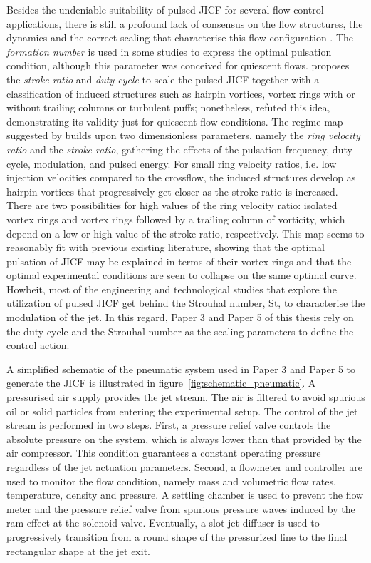 Besides the undeniable suitability of pulsed JICF for several flow control applications, there is still a profound lack of consensus on the flow structures, the dynamics and the correct scaling that characterise this flow configuration \citep{Sau2010optJICF}. The \textit{formation number} \citep{gharib1998scalingVR} is used in some studies \citep[e.g.][]{MCLOSKEY2002,shapiro2006optimization} to express the optimal pulsation condition, although this parameter was conceived for quiescent flows. \citet{Johari2006scaling} proposes the \textit{stroke ratio} and \textit{duty cycle} to scale the pulsed JICF together with a classification of induced structures such as hairpin vortices, vortex rings with or without trailing columns or turbulent puffs; nonetheless, \citet{Sau2008dynamicsVRICF} refuted this idea, demonstrating its validity just for quiescent flow conditions. The regime map suggested by \citet{Sau2010optJICF} builds upon two dimensionless parameters, namely the \textit{ring velocity ratio} and the \textit{stroke ratio}, gathering the effects of the pulsation frequency, duty cycle, modulation, and pulsed energy. For small ring velocity ratios, i.e. low injection velocities compared to the crossflow, the induced structures develop as hairpin vortices that progressively get closer as the stroke ratio is increased. There are two possibilities for high values of the ring velocity ratio: isolated vortex rings and vortex rings followed by a trailing column of vorticity, which depend on a low or high value of the stroke ratio, respectively. This map seems to reasonably fit with previous existing literature, showing that the optimal pulsation of JICF may be explained in terms of their vortex rings and that the optimal experimental conditions are seen to collapse on the same optimal curve. Howbeit, most of the engineering and technological studies that explore the utilization of pulsed JICF get behind the Strouhal number, $\mathrm{St}$, to characterise the modulation of the jet. In this regard, Paper 3 and Paper 5 of this thesis rely on the duty cycle and the Strouhal number as the scaling parameters to define the control action.

A simplified schematic of the pneumatic system used in Paper 3 and Paper 5 to generate the JICF is illustrated in figure~\ref{fig:schematic_pneumatic}. A pressurised air supply provides the jet stream. The air is filtered to avoid spurious oil or solid particles from entering the experimental setup. The control of the jet stream is performed in two steps. First, a pressure relief valve controls the absolute pressure on the system, which is always lower than that provided by the air compressor. This condition guarantees a constant operating pressure regardless of the jet actuation parameters. Second, a flowmeter and controller are used to monitor the flow condition, namely mass and volumetric flow rates, temperature, density and pressure. A settling chamber is used to prevent the flow meter and the pressure relief valve from spurious pressure waves induced by the ram effect at the solenoid valve. Eventually, a slot jet diffuser is used to progressively transition from a round shape of the pressurized line to the final rectangular shape at the jet exit.

